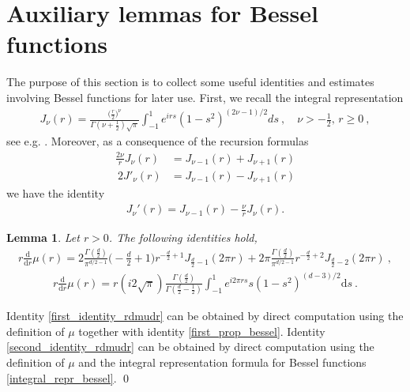\documentclass[a4paper, reqno]{amsart}
\newtheorem{lemma}[thm]{Lemma}
\theoremstyle{definition}
\newcommand{\dd}{{\mathrm d}}
\begin{document}
\section{Auxiliary lemmas for Bessel functions}
\label{sec: auxlem}
The purpose of this section is to collect some useful identities and estimates involving Bessel functions for later use. First, we recall the integral representation 
\begin{align}\label{integral_repr_bessel}
    J_\nu(r)= \frac{\big(\tfrac{r}{2}\big)^{\nu}}{\Gamma(\nu+\tfrac{1}{2})\sqrt{\pi}} \int_{-1}^1 e^{irs}(1-s^2)^{(2\nu-1)/2}
ds~, \quad \nu>-\frac{1}{2},\, r\geq 0~, \end{align}
see e.g. \cite[Appendix~B]{Gr14}.
Moreover, as a consequence of the recursion formulas 
\begin{align*}
   \frac{2\nu}{r} J_\nu(r) & = J_{\nu-1}(r)+J_{\nu+1}(r) \\\
   2 J'_\nu(r) & = J_{\nu-1}(r) - J_{\nu+1}(r)
\end{align*}
we have the identity
\begin{align}\label{first_prop_bessel}
J_\nu'(r)=J_{\nu-1}(r)-\frac{\nu}{r}J_\nu(r).
\end{align}

\begin{lemma}
Let $r>0$. The following identities hold,
\begin{align}\label{first_identity_rdmudr}
    r\frac{\dd}{\dd r} \mu(r)= 2 \frac{\Gamma(\tfrac{d}{2})}{\pi^{d/2-1}}\bigg(-\frac{d}{2}+1 \bigg) r^{-\tfrac{d}{2}+1}J_{\tfrac{d}{2}-1}(2\pi r) + 2\pi \frac{\Gamma(\tfrac{d}{2})}{\pi^{d/2-1}}r^{-\tfrac{d}{2}+2}J_{\tfrac{d}{2}-2}(2\pi r)~,
\end{align}
\begin{align}\label{second_identity_rdmudr}
     r\frac{\dd}{\dd r} \mu(r)= r (i2\sqrt{\pi}) \frac{\Gamma(\tfrac{d}{2})}{\Gamma(\tfrac{d}{2}-\tfrac{1}{2})} \int_{-1}^1 e^{i2\pi rs}s(1-s^2)^{(d-3)/2}\dd s~.
\end{align}
\end{lemma}
\proof Identity \eqref{first_identity_rdmudr} can be obtained by direct computation using the definition of $\mu$  together with identity \eqref{first_prop_bessel}. Identity \eqref{second_identity_rdmudr} can be obtained by direct computation using the definition of $\mu$ and the integral representation formula for Bessel functions \eqref{integral_repr_bessel}.
\qed
\end{document}
